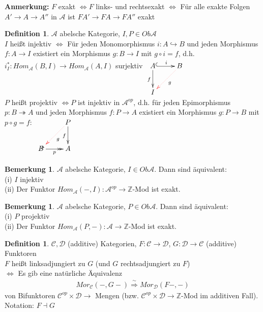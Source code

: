 \documentclass[10pt,a4paper,numbers=endperiod]{scrreprt}
\theoremstyle{definition}
\newtheorem{defi}[satz]{Definition}
\newtheorem{bem}[satz]{Bemerkung}
\def\ZZ{{\mathbb Z}}
\begin{document}
\textbf{Anmerkung:} $F$ exakt $\Leftrightarrow F$ links- und rechtsexakt $\Leftrightarrow$ Für alle exakte Folgen $A' \to A \to A''$ in $\mathcal{A}$ ist $FA' \to FA \to FA''$ exakt

\begin{defi}
	$\mathcal{A}$ abelsche Kategorie, $I, P \in Ob \mathcal{A}$\\
	$I$ heißt injektiv $\Leftrightarrow$ Für jeden Monomorphismus $i: A \hookrightarrow B$ und jeden Morphismus $f: A \to I$ existiert ein Morphismus $g: B \to I$ mit $g \circ i = f$, d.h. $i_I^*: Hom_\mathcal{A} (B, I) \to Hom_\mathcal{A} (A, I)$ surjektiv $\xymatrix{ A \ar[d]_f \ar@{^{(}->}[r]^i & B \ar@[red]@{.>}[dl]^g\\
	I &
	}$\\
	$P$ heißt projektiv $\Leftrightarrow P$ ist injektiv in $\mathcal{A}^{op}$, d.h. für jeden Epimorphismus $p: B \twoheadrightarrow A$ und jeden Morphismus $f: P \to A$ existiert ein Morphismus $g: P \to B$ mit $p \circ g = f:$ $\xymatrix{
		& P \ar[d]_f \ar@[red]@{.>}[dl]^g\\
		B \ar\ar@{->>}[r]_p & A
	}$
\end{defi}

\begin{bem}
	$\mathcal{A}$ abelsche Kategorie, $I \in Ob \mathcal{A}$. Dann sind äquivalent:\\
	(i) $I$ injektiv\\
	(ii) Der Funktor $Hom_\mathcal{A} (-, I): \mathcal{A}^{op} \to \ZZ$-Mod ist exakt.
\end{bem}

\begin{bem}
	$\mathcal{A}$ abelsche Kategorie, $P \in Ob \mathcal{A}$. Dann sind äquivalent:\\
	(i) $P$ projektiv\\
	(ii) Der Funktor $Hom_\mathcal{A} (P, -): \mathcal{A} \to \ZZ$-Mod ist exakt.
\end{bem}

\begin{defi}
	$\mathcal{C}, \mathcal{D}$ (additive) Kategorien, $F: \mathcal{C} \to \mathcal{D}$, $G: \mathcal{D} \to \mathcal{C}$ (additive) Funktoren\\
	$F$ heißt linksadjungiert zu $G$ (und $G$ rechtsadjungiert zu $F$)\\
	$\Leftrightarrow$ Es gib eine natürliche Äquivalenz \begin{align*}
		Mor_\mathcal{C} (-, G-) \overset{\sim}{\Rightarrow} Mor_\mathcal{D}(F-,-)
	\end{align*}
	von Bifunktoren $\mathcal{C}^{op} \times \mathcal{D} \to$ Mengen (bzw. $\mathcal{C}^{op} \times \mathcal{D} \to \ZZ$-Mod im additiven Fall).\\
	Notation: $F \dashv G$ 
\end{defi}
\end{document}
